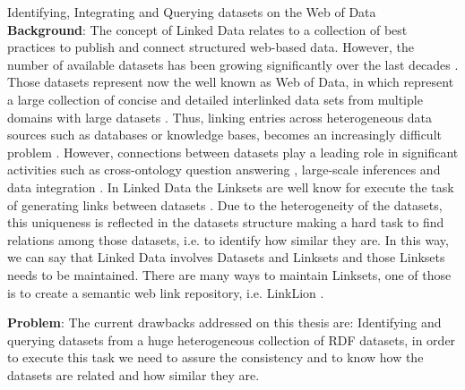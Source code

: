 {\Huge Identifying, Integrating and Querying datasets on the Web of Data}\\

\textbf{Background}:
The concept of Linked Data relates to a collection of best practices to publish and connect structured web-based data. However, the number of available datasets has been growing significantly over the last decades \cite{bizer2011linked}. Those datasets represent now the well known as Web of Data, in which represent a large collection of concise and detailed interlinked data sets from multiple domains with large datasets \cite{saleem2013linked}. Thus, linking entries across heterogeneous data sources such as databases or knowledge bases, becomes an increasingly difficult problem \cite{valdestilhas2017high, NGAU11, saeedi2018scalable}. However, connections between datasets play a leading role in significant activities such as cross-ontology question answering \cite{lopez2009cross}, large-scale inferences \cite{urbani2010owl} and data integration \cite{rahm2016case}. In Linked Data the Linksets are well know for execute the task of generating links between datasets \cite{NGAU11}. Due to the heterogeneity of the datasets, this uniqueness is reflected in the datasets structure making a hard task to find relations among those datasets, i.e.  to identify how similar they are. In this way, we can say that Linked Data involves Datasets and Linksets and those Linksets needs to be maintained. There are many ways to maintain Linksets, one of those is to create a semantic web link repository, i.e. LinkLion \cite{linklion2014}.

\textbf{Problem}:
The current drawbacks addressed on this thesis are: Identifying and querying datasets from a huge heterogeneous collection of RDF datasets, in order to execute this task we need to assure the consistency and to know how the datasets are related and how similar they are. 

